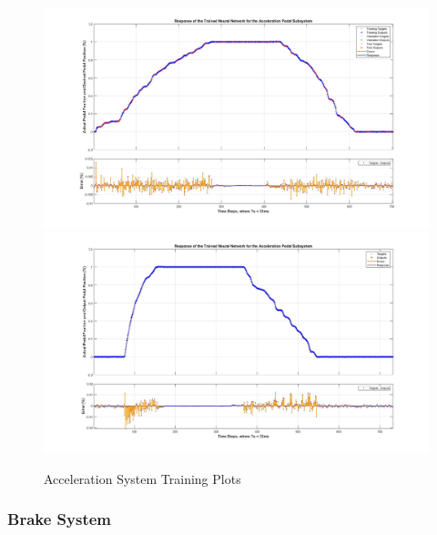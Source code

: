 \documentclass[journal,twoside,web]{ieeecolor}
\begin{document}
\begin{figure}[htbp]
	\centering
		{\includegraphics[width=0.48\linewidth]{figs/img/accelNeuralNetworkTrainedOutput}}
		{\includegraphics[width=0.48\linewidth]{figs/img/accelNeuralNetworkTrainedOutput2}}
	\caption{Acceleration System Training Plots}
\end{figure}


\subsubsection{Brake System}
\end{document}
